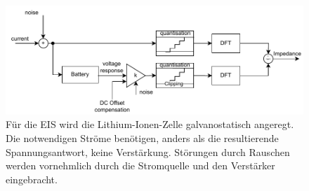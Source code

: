 \begin{figure}[h] 
	\centering 
	\includegraphics[width=1.2\columnwidth]{../img/histo_real.pdf}
	\caption{Für die EIS wird die Lithium-Ionen-Zelle galvanostatisch angeregt. Die notwendigen Ströme benötigen, anders als die resultierende Spannungsantwort, keine Verstärkung. Störungen durch Rauschen werden vornehmlich durch die Stromquelle und den Verstärker eingebracht.}
	\label{fig:system}
\end{figure}
